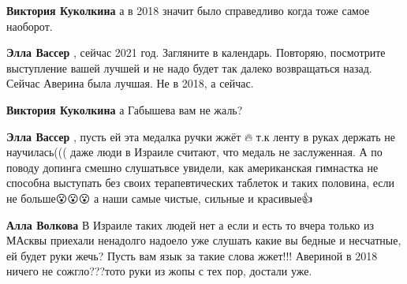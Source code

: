 \begin{itemize}
\begin{itemize}
 
\textbf{Виктория Куколкина} а в 2018 значит было справедливо когда тоже самое наоборот.

 
\textbf{Элла Вассер} , сейчас 2021 год. Загляните в календарь. Повторяю,
посмотрите выступление вашей лучшей и не надо будет так далеко возвращаться
назад. Сейчас Аверина была лучшая. Не в 2018, а сейчас.

 
\textbf{Виктория Куколкина} а Габышева вам не жаль?

 
\textbf{Элла Вассер} , пусть ей эта медалка ручки жжёт 🔥 т.к ленту в руках
держать не научилась((( даже люди в Израиле считают, что медаль не заслуженная.
А по поводу допинга смешно слушать\Laughey[1.0][white] все увидели, как американская гимнастка не
способна выступать без своих терапевтических таблеток \Laughey[1.0][white]и таких половина, если
не больше😮😮😮 а наши самые чистые, сильные и красивые👍💪😍

 
\textbf{Алла Волкова} В Израиле таких людей нет а если и есть то вчера только
из МАсквы приехали ненадолго надоело уже слушать какие вы бедные и несчатные,
ей будет руки жечь? Пусть вам язык за такие слова жжет!!! Авериной в 2018
ничего не сожгло???тото руки из жопы с тех пор, достали уже.


\end{itemize}
\end{itemize}
